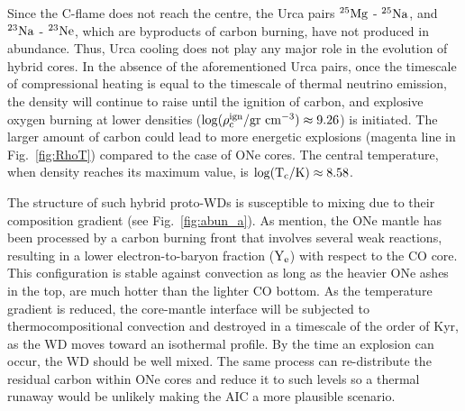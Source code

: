 \documentclass[../../main/thesis_msc.tex]{subfiles}
\begin{document}
        Since the C-flame does not reach the centre, the Urca pairs $\rm ^{25}Mg$ - $\rm ^{25}Na$, and $\rm ^{23}Na$ - $\rm ^{23}Ne$, which are byproducts of carbon burning, have not produced in abundance. Thus, Urca cooling does not play any major role in the evolution of hybrid cores. In the absence of the aforementioned Urca pairs, once the timescale of compressional heating is equal to the timescale of thermal neutrino emission, the density will continue to raise until the ignition of carbon, and explosive oxygen burning at lower densities ($\rm \log(\rho_c^{\rm ign} / \rm gr \ cm^{-3}) \approx 9.26$) is initiated. The larger amount of carbon could lead to more energetic explosions (magenta line in Fig.\, \ref{fig:RhoT}) compared to the case of ONe cores. The central temperature, when density reaches its maximum value, is $\rm \log(T_c / \rm K) \approx 8.58$.
        
        The structure of such hybrid proto-WDs is susceptible to mixing due to their composition gradient (see Fig.\, \ref{fig:abun_a}). As \cite{brooks2017} mention, the ONe mantle has been processed by a carbon burning front that involves several weak reactions, resulting in a lower electron-to-baryon fraction ($\rm Y_e$) with respect to the CO core. This configuration is stable against convection as long as the heavier ONe ashes in the top, are much hotter than the lighter CO bottom. As the temperature gradient is reduced, the core-mantle interface will be subjected to thermocompositional convection and destroyed in a timescale of the order of Kyr, as the WD moves toward an isothermal profile. By the time an explosion can occur, the WD should be well mixed. The same process can re-distribute the residual carbon within ONe cores and reduce it to such levels so a thermal runaway would be unlikely making the AIC a more plausible scenario.

    
    
\end{document}
